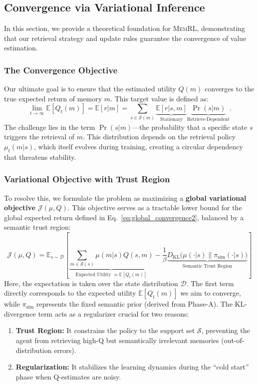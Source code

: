 \documentclass{article}
\theoremstyle{plain}
\theoremstyle{definition}
\theoremstyle{remark}
\begin{document}
\subsection{Convergence via Variational Inference}
\label{app:gem_analysis}

In this section, we provide a theoretical foundation for \textsc{MemRL}, demonstrating that our retrieval strategy and update rules guarantee the convergence of value estimation.

\subsubsection{The Convergence Objective}
Our ultimate goal is to ensure that the estimated utility $Q(m)$ converges to the true expected return of memory $m$. This target value is defined as:
\begin{equation}
\label{eq:global_convergence2}
\lim_{t \to \infty} \mathbb{E}[Q_t(m)] 
= \mathbb{E}[r | m] 
= \sum_{s \in \mathcal{S}(m)} \underbrace{\mathbb{E}[r | s, m]}_{\text{Stationary}} \underbrace{\Pr(s | m)}_{\text{Retrieve-Dependent}}.
\end{equation}
The challenge lies in the term $\Pr(s | m)$—the probability that a specific state $s$ triggers the retrieval of $m$. This distribution depends on the retrieval policy $\mu_t(m|s)$, which itself evolves during training, creating a circular dependency that threatens stability.

\subsubsection{Variational Objective with Trust Region}
To resolve this, we formulate the problem as maximizing a \textbf{global variational objective} $\mathcal{J}(\mu, Q)$. This objective serves as a tractable lower bound for the global expected return defined in Eq.~\ref{eq:global_convergence2}, balanced by a semantic trust region:
\begin{equation}
\label{eq:variational_objective}
\mathcal{J}(\mu, Q) = \mathbb{E}_{s \sim \mathcal{D}} \left[ \underbrace{\sum_{m \in \mathcal{S}(s)} \mu(m|s) Q(s, m)}_{\text{Expected Utility } \approx \mathbb{E}[Q_t(m)]} - \frac{1}{\beta} \underbrace{D_{\text{KL}}\Big(\mu(\cdot|s) \big\| \pi_{\text{sim}}(\cdot|s)\Big)}_{\text{Semantic Trust Region}} \right]
\end{equation}
Here, the expectation is taken over the state distribution $\mathcal{D}$. The first term directly corresponds to the expected utility $\mathbb{E}[Q_t(m)]$ we aim to converge, while $\pi_{\text{sim}}$ represents the fixed semantic prior (derived from Phase-A). The KL-divergence term acts as a regularizer crucial for two reasons:
\begin{enumerate}[leftmargin=*]
    \item \textbf{Trust Region:} It constrains the policy to the support set $\mathcal{S}$, preventing the agent from retrieving high-Q but semantically irrelevant memories (out-of-distribution errors).
    \item \textbf{Regularization:} It stabilizes the learning dynamics during the ``cold start'' phase when Q-estimates are noisy.
\end{enumerate}
\end{document}
